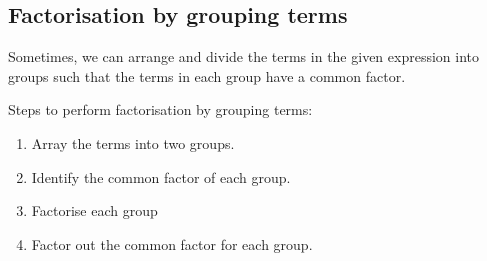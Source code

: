 \documentclass[../main]{subfiles}
\begin{document}
\subsection{Factorisation by grouping terms}

Sometimes, we can arrange and divide the terms in the given expression into
groups such that the terms in each group have a common factor.

Steps to perform factorisation by grouping terms:
\begin{enumerate}
\item Array the terms into two groups.
 
\item  Identify the common factor of each group.
\item  Factorise each group
\item Factor out the common factor for each group.
  
\end{enumerate}
\end{document}
